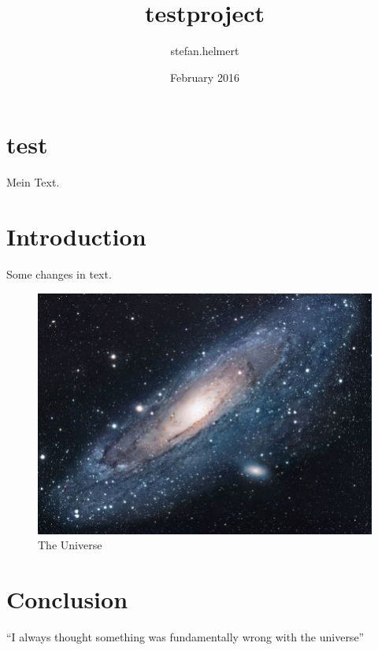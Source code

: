 \documentclass{article}
\title{testproject}
\author{stefan.helmert }
\date{February 2016}
\begin{document}
\maketitle

\section{test}
Mein Text.

\section{Introduction}
Some changes in text.

\begin{figure}[h!]
\centering
\includegraphics[scale=1.7]{universe.jpg}
\caption{The Universe}
\label{fig:univerise}
\end{figure}

\section{Conclusion}
``I always thought something was fundamentally wrong with the universe'' \citep{adams1995hitchhiker}



\end{document}
